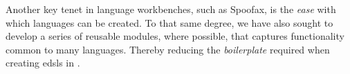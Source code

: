 Another key tenet in language workbenches, such as Spoofax, is the \emph{ease} with which languages can be created.
%
To that same degree, we have also sought to develop a series of reusable modules, where possible, that captures functionality common to many languages.
%
Thereby reducing the \emph{boilerplate} required when creating \acp{edsl} in \Idris{}.


